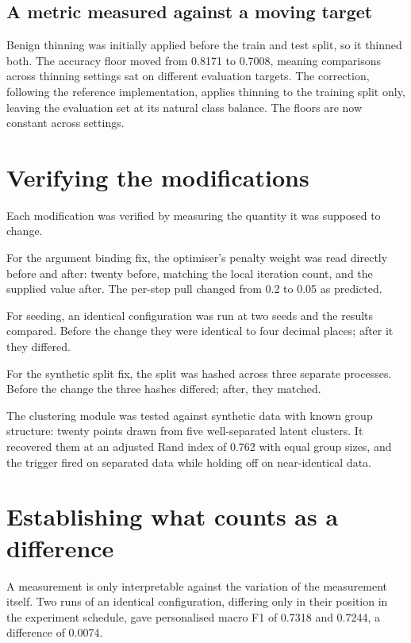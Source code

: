 \subsection{A metric measured against a moving target}

Benign thinning was initially applied before the train and test split, so it
thinned both. The accuracy floor moved from 0.8171 to 0.7008, meaning
comparisons across thinning settings sat on different evaluation targets. The
correction, following the reference implementation, applies thinning to the
training split only, leaving the evaluation set at its natural class balance.
The floors are now constant across settings.

\section{Verifying the modifications}
\label{sec:verify-mods}

Each modification was verified by measuring the quantity it was supposed to
change.

For the argument binding fix, the optimiser's penalty weight was read directly
before and after: twenty before, matching the local iteration count, and the
supplied value after. The per-step pull changed from 0.2 to 0.05 as predicted.

For seeding, an identical configuration was run at two seeds and the results
compared. Before the change they were identical to four decimal places; after
it they differed.

For the synthetic split fix, the split was hashed across three separate
processes. Before the change the three hashes differed; after, they matched.

The clustering module was tested against synthetic data with known group
structure: twenty points drawn from five well-separated latent clusters. It
recovered them at an adjusted Rand index of 0.762 with equal group sizes, and
the trigger fired on separated data while holding off on near-identical data.

\section{Establishing what counts as a difference}
\label{sec:noise-floor}

A measurement is only interpretable against the variation of the measurement
itself. Two runs of an identical configuration, differing only in their
position in the experiment schedule, gave personalised macro F1 of 0.7318 and
0.7244, a difference of 0.0074.

